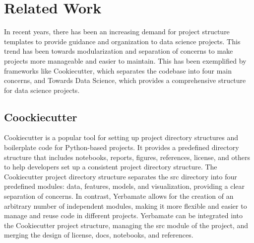 \section{Related Work}

In recent years, there has been an increasing demand for project structure templates to provide guidance and organization to data science projects. This trend has been towards modularization and separation of concerns to make projects more manageable and easier to maintain. This has been exemplified by frameworks like Cookiecutter, which separates the codebase into four main concerns, and Towards Data Science, which provides a comprehensive structure for data science projects. 

\subsection{Coockiecutter}
Cookiecutter is a popular tool for setting up project directory structures and boilerplate code for Python-based projects. It provides a predefined directory structure that includes notebooks, reports, figures, references, license, and others to help developers set up a consistent project directory structure. The Cookiecutter project directory structure separates the src directory into four predefined modules: data, features, models, and visualization, providing a clear separation of concerns. In contrast, Yerbamate allows for the creation of an arbitrary number of independent modules, making it more flexible and easier to manage and reuse code in different projects. Yerbamate can be integrated into the Cookiecutter project structure, managing the src module of the project, and merging the design of license, docs, notebooks, and references. 



